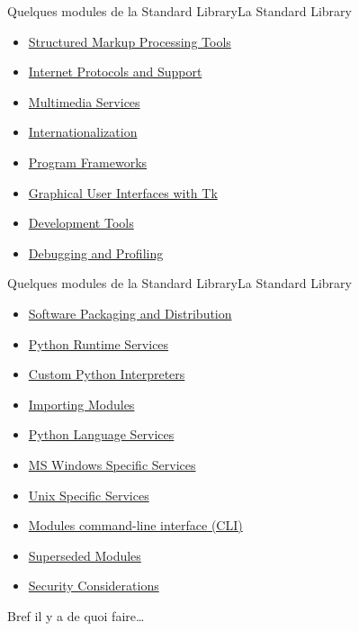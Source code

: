 \documentclass{beamer}
\begin{document}
\begin{frame}{Quelques modules de la Standard Library}{La Standard Library}
\begin{tiny}
\begin{itemize}
                \item \href{https://docs.python.org/3/library/markup.html}{Structured Markup Processing Tools}
                \item \href{https://docs.python.org/3/library/internet.html}{Internet Protocols and Support}
                \item \href{https://docs.python.org/3/library/mm.html}{Multimedia Services}
                \item \href{https://docs.python.org/3/library/i18n.html}{Internationalization}
                \item \href{https://docs.python.org/3/library/frameworks.html}{Program Frameworks}
                \item \href{https://docs.python.org/3/library/tk.html}{Graphical User Interfaces with Tk}
                \item \href{https://docs.python.org/3/library/development.html}{Development Tools}
                \item \href{https://docs.python.org/3/library/debug.html}{Debugging and Profiling}
            \end{itemize}
        \end{tiny}
    \end{frame}

    \begin{frame}{Quelques modules de la Standard Library}{La Standard Library}
        \begin{itemize}
            \item \href{https://docs.python.org/3/library/distribution.html}{Software Packaging and Distribution}
            \item \href{https://docs.python.org/3/library/python.html}{Python Runtime Services}
            \item \href{https://docs.python.org/3/library/custominterp.html}{Custom Python Interpreters}
            \item \href{https://docs.python.org/3/library/modules.html}{Importing Modules}
            \item \href{https://docs.python.org/3/library/language.html}{Python Language Services}
            \item \href{https://docs.python.org/3/library/windows.html}{MS Windows Specific Services}
            \item \href{https://docs.python.org/3/library/unix.html}{Unix Specific Services}
            \item \href{https://docs.python.org/3/library/cmdline.html}{Modules command-line interface (CLI)}
            \item \href{https://docs.python.org/3/library/superseded.html}{Superseded Modules}
            \item \href{https://docs.python.org/3/library/security_warnings.html}{Security Considerations}
        \end{itemize}
        \bigbreak
        Bref il y a de quoi faire\ldots
    \end{frame}
\end{document}
